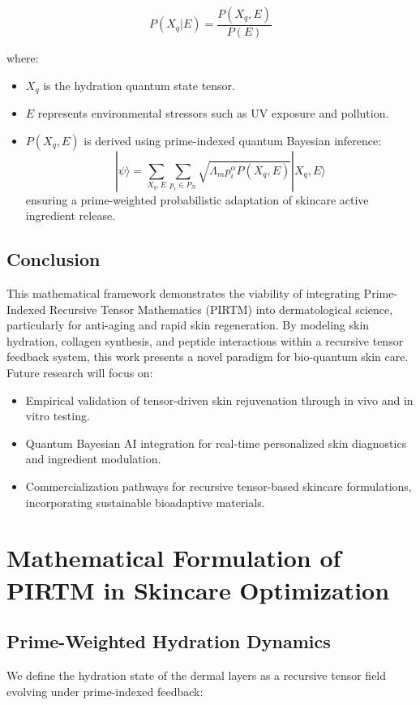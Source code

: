 \documentclass{article}
\theoremstyle{plain}
\theoremstyle{claimstyle}
\begin{document}
\begin{equation}
    P(X_q | E) = \frac{P(X_q, E)}{P(E)}
\end{equation}

where:
\begin{itemize}
    \item \( X_q \) is the hydration quantum state tensor.
    \item \( E \) represents environmental stressors such as UV exposure and pollution.
    \item \( P(X_q, E) \) is derived using prime-indexed quantum Bayesian inference:
    \begin{equation}
        |\psi \rangle = \sum_{X_q, E} \sum_{p_i \in P_N} \sqrt{\Lambda_m p_i^{\alpha} P(X_q, E)} |X_q, E \rangle
    \end{equation}
    ensuring a prime-weighted probabilistic adaptation of skincare active ingredient release.
\end{itemize}

\subsection{Conclusion}
This mathematical framework demonstrates the viability of integrating Prime-Indexed Recursive Tensor Mathematics (PIRTM) into dermatological science, particularly for anti-aging and rapid skin regeneration. By modeling skin hydration, collagen synthesis, and peptide interactions within a recursive tensor feedback system, this work presents a novel paradigm for bio-quantum skin care. Future research will focus on:
\begin{itemize}
    \item Empirical validation of tensor-driven skin rejuvenation through in vivo and in vitro testing.
    \item Quantum Bayesian AI integration for real-time personalized skin diagnostics and ingredient modulation.
    \item Commercialization pathways for recursive tensor-based skincare formulations, incorporating sustainable bioadaptive materials.
\end{itemize}

\section{Mathematical Formulation of PIRTM in Skincare Optimization}

\subsection{Prime-Weighted Hydration Dynamics}
We define the hydration state of the dermal layers as a recursive tensor field evolving under prime-indexed feedback:
\end{document}
